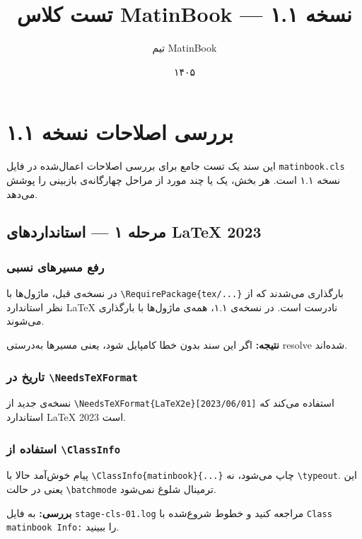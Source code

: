 \documentclass{matinbook}
\title{تست کلاس MatinBook — نسخه ۱.۱}
\author{تیم MatinBook}
\date{۱۴۰۵}
\begin{document}
\maketitle

\chapter{بررسی اصلاحات نسخه ۱.۱}
\label{chap:test-cls}

این سند یک تست جامع برای بررسی اصلاحات اعمال‌شده در فایل
\verb|matinbook.cls| نسخه ۱.۱ است. هر بخش، یک یا چند مورد از
مراحل چهارگانه‌ی بازبینی را پوشش می‌دهد.

\section{مرحله ۱ — استانداردهای LaTeX 2023}
\label{sec:stage1}

\subsection{رفع مسیرهای نسبی}

در نسخه‌ی قبل، ماژول‌ها با \verb|\RequirePackage{tex/...}| بارگذاری
می‌شدند که از نظر استاندارد LaTeX نادرست است. در نسخه‌ی ۱.۱، همه‌ی
ماژول‌ها با \verb|| بارگذاری می‌شوند.

\textbf{نتیجه:} اگر این سند بدون خطا کامپایل شود، یعنی مسیرها
به‌درستی resolve شده‌اند.

\subsection{تاریخ در \texttt{\textbackslash NeedsTeXFormat}}

نسخه‌ی جدید از \verb|\NeedsTeXFormat{LaTeX2e}[2023/06/01]| استفاده
می‌کند که استاندارد LaTeX 2023 است.

\subsection{استفاده از \texttt{\textbackslash ClassInfo}}

پیام خوش‌آمد حالا با \verb|\ClassInfo{matinbook}{...}| چاپ می‌شود،
نه \verb|\typeout|. این یعنی در حالت \verb|\batchmode| ترمینال
شلوغ نمی‌شود.

\textbf{بررسی:} به فایل \verb|stage-cls-01.log| مراجعه کنید و
خطوط شروع‌شده با \verb|Class matinbook Info:| را ببینید.

\end{document}
